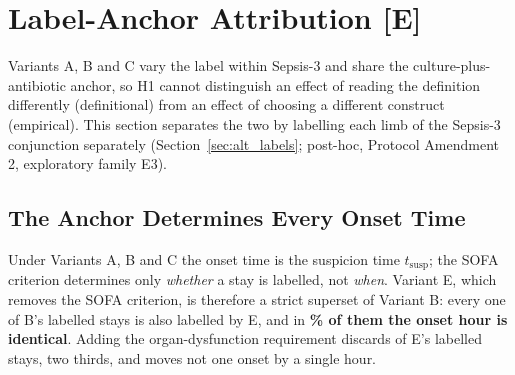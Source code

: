 

\section{Label-Anchor Attribution \texorpdfstring{[E]}{[E]}}
\label{sec:label_anchor_results}

Variants A, B and C vary the label within Sepsis-3 and share the
culture-plus-antibiotic anchor, so H1 cannot distinguish an effect of reading
the definition differently (definitional) from an effect of choosing a
different construct (empirical). This section separates the two by labelling
each limb of the Sepsis-3 conjunction separately (Section~\ref{sec:alt_labels};
post-hoc, Protocol Amendment 2, exploratory family E3).

\subsection{The Anchor Determines Every Onset Time}

Under Variants A, B and C the onset time is the suspicion time
$t_{\text{susp}}$; the SOFA criterion determines only \emph{whether} a stay is
labelled, not \emph{when}. Variant E, which removes the SOFA criterion, is
therefore a strict superset of Variant B: every one of B's
\pcNPositiveBPanel{} labelled stays is also labelled by E, and in
\textbf{\pcPctExactMatchE\% of them the onset hour is identical}. Adding the
organ-dysfunction requirement discards \pcNPositiveEExcessOverB{} of E's
\pcNPositiveE{} labelled stays, two thirds, and moves not one onset
by a single hour.

